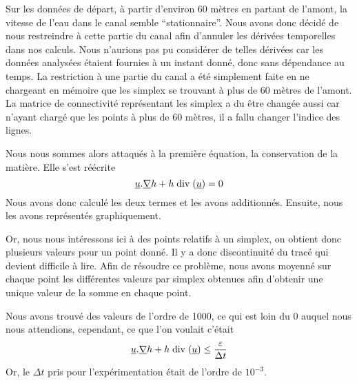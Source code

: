 \documentclass[a4paper,10pt]{article}
\begin{document}
  Sur les données de départ, à partir d'environ 60 mètres en partant de l'amont, la vitesse de l'eau dans le canal
  semble ``stationnaire''. Nous avons donc décidé de nous restreindre à cette partie du canal afin d'annuler les dérivées
  temporelles dans nos calculs. Nous n'aurions pas pu considérer de telles dérivées car les données analysées étaient fournies à
  un instant donné, donc sans dépendance au temps.
  La restriction à une partie du canal a été simplement faite en ne chargeant en mémoire que les simplex se trouvant à plus de
  60 mètres de l'amont. La matrice de connectivité représentant les simplex a du être changée aussi car n'ayant chargé que les
  points à plus de 60 mètres, il a fallu changer l'indice des lignes.
  
  Nous nous sommes alors attaqués à la première équation, la conservation de la matière.
  Elle s'est réécrite
  \begin{equation}
    \underline u . \underline \nabla h + h\bdiv(\underline u) = 0
  \end{equation}
  Nous avons donc calculé les deux termes et les avons additionnés. Ensuite, nous les avons représentés graphiquement.
  
  Or, nous nous intéressons ici à des points relatifs à un simplex, on obtient donc plusieurs valeurs pour un point donné.
  Il y a donc discontinuité du tracé qui devient difficile à lire. Afin de résoudre ce problème, nous avons moyenné sur
  chaque point les différentes valeurs par simplex obtenues afin d'obtenir une unique valeur de la somme en chaque point.
  
  Nous avons trouvé des valeurs de l'ordre de 1000, ce qui est loin du 0 auquel nous nous attendions, cependant, ce que l'on voulait
  c'était
  \begin{equation}
    \underline u . \underline \nabla h + h\bdiv(\underline u) \leq \frac{\varepsilon}{\Delta t}
  \end{equation}
  Or, le $\Delta t$ pris pour l'expérimentation était de l'ordre de $10^{-3}$.
  
\end{document}
